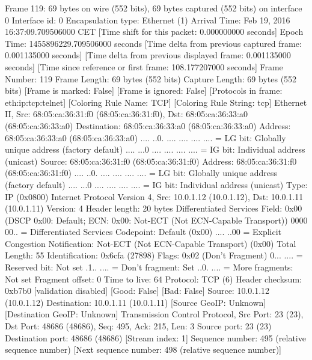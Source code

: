 Frame 119: 69 bytes on wire (552 bits), 69 bytes captured (552 bits) on interface 0
    Interface id: 0
    Encapsulation type: Ethernet (1)
    Arrival Time: Feb 19, 2016 16:37:09.709506000 CET
    [Time shift for this packet: 0.000000000 seconds]
    Epoch Time: 1455896229.709506000 seconds
    [Time delta from previous captured frame: 0.001135000 seconds]
    [Time delta from previous displayed frame: 0.001135000 seconds]
    [Time since reference or first frame: 108.177207000 seconds]
    Frame Number: 119
    Frame Length: 69 bytes (552 bits)
    Capture Length: 69 bytes (552 bits)
    [Frame is marked: False]
    [Frame is ignored: False]
    [Protocols in frame: eth:ip:tcp:telnet]
    [Coloring Rule Name: TCP]
    [Coloring Rule String: tcp]
Ethernet II, Src: 68:05:ca:36:31:f0 (68:05:ca:36:31:f0), Dst: 68:05:ca:36:33:a0 (68:05:ca:36:33:a0)
    Destination: 68:05:ca:36:33:a0 (68:05:ca:36:33:a0)
        Address: 68:05:ca:36:33:a0 (68:05:ca:36:33:a0)
        .... ..0. .... .... .... .... = LG bit: Globally unique address (factory default)
        .... ...0 .... .... .... .... = IG bit: Individual address (unicast)
    Source: 68:05:ca:36:31:f0 (68:05:ca:36:31:f0)
        Address: 68:05:ca:36:31:f0 (68:05:ca:36:31:f0)
        .... ..0. .... .... .... .... = LG bit: Globally unique address (factory default)
        .... ...0 .... .... .... .... = IG bit: Individual address (unicast)
    Type: IP (0x0800)
Internet Protocol Version 4, Src: 10.0.1.12 (10.0.1.12), Dst: 10.0.1.11 (10.0.1.11)
    Version: 4
    Header length: 20 bytes
    Differentiated Services Field: 0x00 (DSCP 0x00: Default; ECN: 0x00: Not-ECT (Not ECN-Capable Transport))
        0000 00.. = Differentiated Services Codepoint: Default (0x00)
        .... ..00 = Explicit Congestion Notification: Not-ECT (Not ECN-Capable Transport) (0x00)
    Total Length: 55
    Identification: 0x6cfa (27898)
    Flags: 0x02 (Don't Fragment)
        0... .... = Reserved bit: Not set
        .1.. .... = Don't fragment: Set
        ..0. .... = More fragments: Not set
    Fragment offset: 0
    Time to live: 64
    Protocol: TCP (6)
    Header checksum: 0xb7b0 [validation disabled]
        [Good: False]
        [Bad: False]
    Source: 10.0.1.12 (10.0.1.12)
    Destination: 10.0.1.11 (10.0.1.11)
    [Source GeoIP: Unknown]
    [Destination GeoIP: Unknown]
Transmission Control Protocol, Src Port: 23 (23), Dst Port: 48686 (48686), Seq: 495, Ack: 215, Len: 3
    Source port: 23 (23)
    Destination port: 48686 (48686)
    [Stream index: 1]
    Sequence number: 495    (relative sequence number)
    [Next sequence number: 498    (relative sequence number)]
